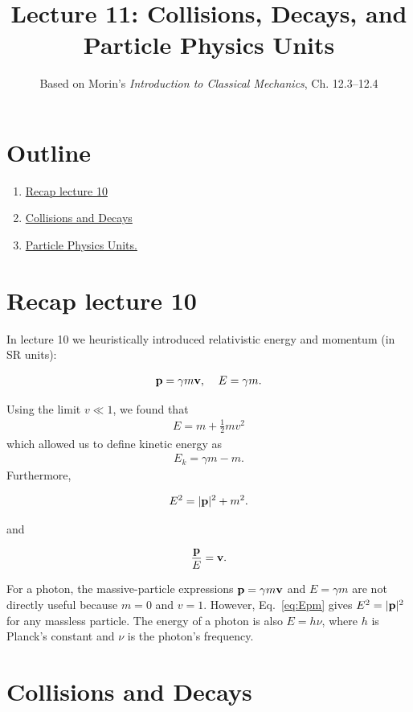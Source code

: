 \documentclass[12pt]{article}
\title{\textbf{Lecture 11: Collisions, Decays, and Particle Physics Units}}
\author{Based on Morin's \textit{Introduction to Classical Mechanics}, Ch. 12.3--12.4}
\date{}
\newcommand{\be}{\begin{eqnarray}}
\newcommand{\ee}{\end{eqnarray}}
\begin{document}
\maketitle

\section*{Outline}
\begin{enumerate}
    \item \href{sec:recap}{Recap lecture 10}
    \item \href{sec:CandD}{Collisions and Decays}
    \item \href{sec:PPU}{Particle Physics Units.}
\end{enumerate}

\section{Recap lecture 10}\label{sec:recap}

In lecture 10 we heuristically introduced relativistic energy and momentum (in SR units): 
\begin{tcolorbox}[colback=blue!5!white]
\vspace{-1.3em}
\be
{\bf p} = \gamma m{\bf v}, \;\;\;\; E = \gamma m.
\ee
\end{tcolorbox}
Using the limit $v\ll 1$, we found that 
\be
E = m + \frac{1}{2}mv^2
\ee
which allowed us to define kinetic energy as 
\be
E_k = \gamma m - m. 
\ee
Furthermore, 
\begin{tcolorbox}[colback=blue!5!white]
\vspace{-1.3em}
\be
E^2 = |{\bf p}|^2+ m^2. \label{eq:Epm}
\ee
\end{tcolorbox}
and 
\begin{tcolorbox}[colback=blue!5!white]
\vspace{-1.3em}
\be
\frac{\bf p}{E} = {\bf v}.
\ee
\end{tcolorbox}
For a photon, the massive-particle expressions ${\bf p}=\gamma m{\bf v}$ and $E=\gamma m$ are not directly useful because $m=0$ and $v=1$. However, Eq.~\eqref{eq:Epm} gives $E^2=|{\bf p}|^2$ for any massless particle. The energy of a photon is also $E=h\nu$, where $h$ is Planck's constant and $\nu$ is the photon's frequency.


\section{Collisions and Decays}\label{sec:CandD}
\end{document}
